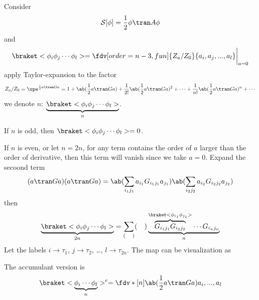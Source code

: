 Consider
\[
  \mathcal S[\phi] = \frac12\phi\tran A\phi
\]
and
\[
  \braket<\phi_i\phi_j \cdots\phi_l>
= \fdv[order = n-3, fun]{Z_a/Z_0}{a_i, a_j, ..., a_l}\bigg|_{a=0}
\]
apply Taylor-expansion to the factor
\[
  Z_a/Z_0 = \upe^{\frac12a\tran G a}
= 1 + \ab(\frac12a\tran Ga) + \frac1{2!}\ab(\frac12a\tran Ga)^2 + \cdots
+ \frac1{n!}\ab(\frac12a\tran Ga)^n + \cdots
\]
we denote $n$: $\underbrace{\braket<\phi_i\phi_j \cdots\phi_l>}_n$.
\begin{enumext}
  \item If $n$ is odd, then $\braket<\phi_i\phi_j \cdots\phi_l> = 0$.
  \item If $n$ is even, or let $n = 2n$,
  for any term contains the order of $a$ larger than the order of derivative,
  then this term will vanish since we take $a = 0$.
  Expand the secoond term
  \[
    (a\tran Ga)(a\tran Ga)
  = \ab(\sum_{i_1j_1} a_{i_1} G_{i_1j_1} a_{j_1})
    \ab(\sum_{i_2j_2} a_{i_2} G_{i_2j_2} a_{j_2})
  \]
  then
  \[
    \underbrace{\braket<\phi_i\phi_j \cdots \phi_l>}_{2n}
  = \sum_{(\quad)} (\quad) \underbrace{
    \overbrace{G_{i_1j_1}G_{i_2j_2}}^{\braket<\phi_{i_1}\phi_{j_1}>}
    \cdots G_{i_nj_n}}_n
  \]
  Let the labels $i\to\tau_1$, $j\to\tau_2$, \ldots, $l\to\tau_{2n}$.
  The map can be visualization as
  \begin{center}
  \end{center}
  The accumulant version is
  \[
    \braket<\underbrace{\phi_i \cdots \phi_l}_n>^c
  = \fdv*[n]{\ab(\frac12a\tran Ga)}{a_i, ..., a_l}
  \]
\end{enumext}

